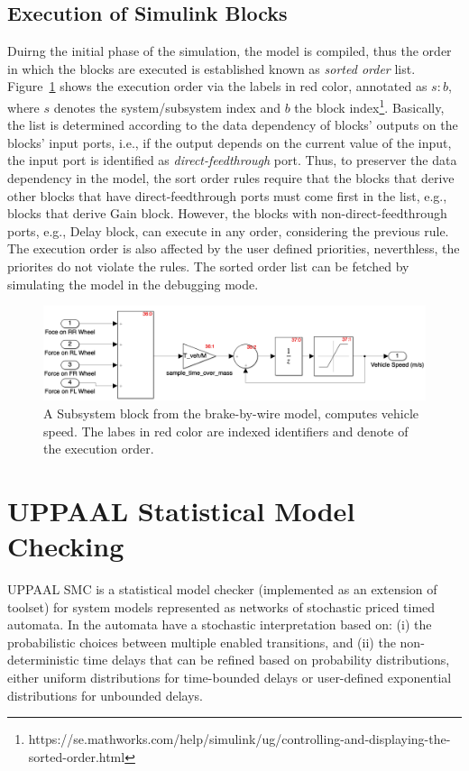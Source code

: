 \subsection*{Execution of Simulink Blocks}
Duirng the initial phase of the simulation, the model is compiled, thus the order in which the blocks are executed is established known as \textit{sorted order} list. Figure~\ref{fig_sm_exec_order} shows the execution order via the labels in red color, annotated as $s:b$, where $s$ denotes the system/subsystem index and $b$ the block index\footnote{https://se.mathworks.com/help/simulink/ug/controlling-and-displaying-the-sorted-order.html}. Basically, the list is determined according to the data dependency of blocks' outputs on the blocks' input ports, i.e., if the output depends on the current value of the input, the input port is identified as \textit{direct-feedthrough} port. Thus, to preserver the data dependency in the model, the sort order rules require that the blocks that derive other blocks that have direct-feedthrough ports must come first in the list, e.g., blocks that derive Gain block. However, the blocks with non-direct-feedthrough ports, e.g., Delay block, can execute in any order, considering the previous rule. The execution order is also affected by the user defined priorities, neverthless, the priorites do not violate the rules. The sorted order list can be fetched by simulating the model in the debugging mode.
\begin{figure}
	\centering
	\includegraphics[width=1\linewidth]{images/sm_exec_order}
	\caption{A Subsystem block from the brake-by-wire model, computes vehicle speed. The labes in red color are indexed identifiers and denote of the execution order.}
	\label{fig_sm_exec_order}
\end{figure}

\section{UPPAAL Statistical Model Checking}
UPPAAL SMC \cite{david2012statistical} is a statistical model checker (implemented as an extension of \uppaal{} toolset) for system models represented as networks of stochastic priced timed automata. In \uppaalsmc{} the automata have a stochastic interpretation based on: (i) the probabilistic choices between multiple enabled transitions, and (ii) the non-deterministic time delays that can be refined based on probability distributions, either uniform distributions for time-bounded delays or user-defined exponential distributions for unbounded delays.

